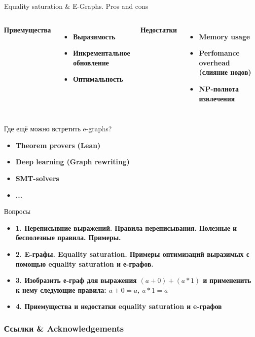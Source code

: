 \documentclass[aspectratio=169
  , xcolor={svgnames}
  , russian  %
  ]{beamer}
\begin{document}
\begin{frame}{Equality saturation \& E-Graphs. Pros and cons}
    \begin{columns}
        \textbf{Приемущества}
        \begin{itemize}
            \item \textbf{Выразимость}
            \item \textbf{Инкрементальное обновление}
            \item \textbf{Оптимальность}
        \end{itemize}

        \textbf{Недостатки}
        \begin{itemize}
            \item \textbf{Memory usage}
            \item \textbf{Perfomance overhead (слияние нодов)}
            \item \textbf{NP-полнота извлечения}
        \end{itemize}
    \end{columns}
\end{frame}

\begin{frame}{Где ещё можно встретить e-graphs?}
    \begin{itemize}
    \item \textbf{\fontsize{14.1}{12} Theorem provers (Lean) \cite{Lean}}
    \newline
    \item \textbf{\fontsize{14.1}{12} Deep learning (Graph rewriting)\cite{Deep_learning}}
    \newline
    \item \textbf{\fontsize{14.1}{12} SMT-solvers\cite{CMT} }
    \newline
    \item \textbf{\fontsize{14.1}{12} ... }
    \end{itemize}
\end{frame}

\begin{frame}{Вопросы}
    \begin{itemize}
    \item \textbf{\fontsize{14.1}{12} 1. Переписывние выражений. Правила переписывания. Полезные и бесполезные правила. Примеры. }
    \newline
    \item \textbf{\fontsize{14.1}{12}
2. E-графы. Equality saturation. Примеры оптимизаций выразимых с помощью equality saturation и е-графов.}
    \newline
    \item \textbf{\fontsize{14.1}{12} 3. Изобразить е-граф для выражения $(a + 0) + (a * 1)$ и примененить к нему следующие правила: $a + 0 = a$, $a * 1 = a$ }
    \newline
    \item \textbf{\fontsize{14.1}{12} 4. Приемущества и недостатки equality saturation и e-графов
 }
    \end{itemize}
\end{frame}

\begin{frame}%
\frametitle<presentation>{Ссылки \& Acknowledgements}
\vspace{-1em}
\printbibliography
\end{frame}
\end{document}
